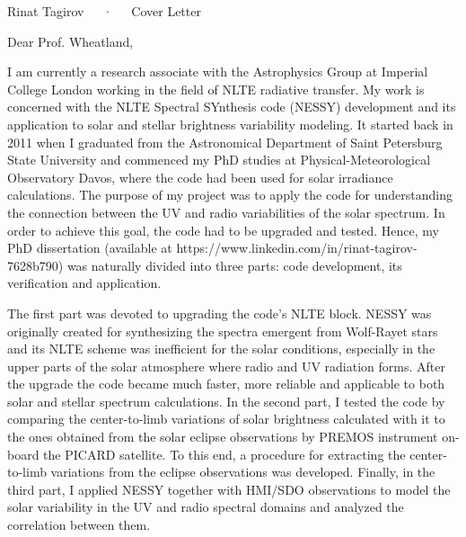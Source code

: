 \documentclass[11pt, a4paper]{awesome-cv}
\begin{document}

\makecvfooter
  {}
  {Rinat Tagirov~~~·~~~Cover Letter}
  {}


\begin{cvletter}

Dear Prof. Wheatland,

I am currently a research associate with the Astrophysics Group at Imperial College London
working in the field of NLTE radiative transfer.
My work is concerned with the NLTE Spectral SYnthesis code (NESSY) development and its application to
solar and stellar brightness variability modeling.
It started back in 2011 when I graduated from the Astronomical Department of Saint Petersburg State University
and commenced my PhD studies at Physical-Meteorological Observatory Davos,
where the code had been used for solar irradiance calculations.
The purpose of my project was to apply the code for understanding the connection between the UV and radio variabilities of the solar spectrum.
In order to achieve this goal, the code had to be upgraded and tested.
Hence, my PhD dissertation (available at https://www.linkedin.com/in/rinat-tagirov-7628b790) was naturally divided into three parts: code development, its verification and application.

The first part was devoted to upgrading the code's NLTE block.
NESSY was originally created for synthesizing the spectra emergent from Wolf-Rayet stars and its NLTE scheme
was inefficient for the solar conditions, especially in the upper parts of the solar atmosphere
where radio and UV radiation forms. After the upgrade the code became much faster, more reliable 
and applicable to both solar and stellar spectrum calculations.
In the second part, I tested the code by comparing the center-to-limb variations of solar brightness calculated with it
to the ones obtained from the solar eclipse observations by PREMOS instrument on-board the PICARD satellite.
To this end, a procedure for extracting the center-to-limb variations from the eclipse observations was developed.
Finally, in the third part, I applied NESSY together with HMI/SDO observations to model the solar variability in the UV and radio
spectral domains and analyzed the correlation between them.


\end{cvletter}
\end{document}

